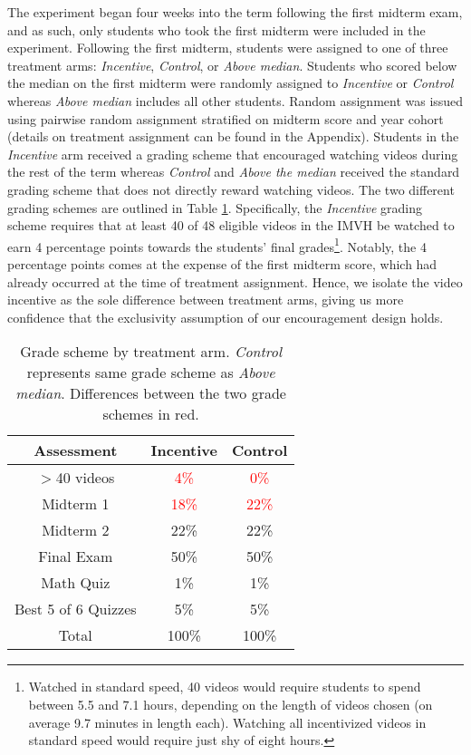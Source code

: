 \documentclass[12pt]{article}
\newcommand{\red}[1]{\textcolor{red}{#1}}
\begin{document}
The experiment began four weeks into the term following the first midterm exam, and as such, only students who took the first midterm were included in the experiment. Following the first midterm, students were assigned to one of three treatment arms: \textit{Incentive}, \textit{Control}, or \textit{Above median}. Students who scored below the median on the first midterm were randomly assigned to \textit{Incentive} or \textit{Control} whereas \textit{Above median} includes all other students. Random assignment was issued using pairwise random assignment stratified on midterm score and year cohort (details on treatment assignment can be found in the Appendix). Students in the \textit{Incentive} arm received a grading scheme that encouraged watching videos during the rest of the term whereas \textit{Control} and \textit{Above the median} received the standard grading scheme that does not directly reward watching videos. The two different grading schemes are outlined in Table \ref{gradescheme}. Specifically, the \textit{Incentive} grading scheme requires that at least 40 of 48 eligible videos in the IMVH be watched to earn 4 percentage points towards the students' final grades\footnote{Watched in standard speed, 40 videos would require students to spend between 5.5 and 7.1 hours, depending on the length of videos chosen (on average 9.7 minutes in length each). Watching all incentivized videos in standard speed would require just shy of eight hours.}.
Notably, the 4 percentage points comes at the expense of the first midterm score, which had already occurred at the time of treatment assignment. Hence, we isolate the video incentive as the sole difference between treatment arms, giving us more confidence that the exclusivity assumption of our encouragement design holds. %

\begin{table}
	\caption{Grade scheme by treatment arm. \textit{Control} represents same grade scheme as \textit{Above median}. Differences between the two grade schemes in red.}
	\centering
	\begin{tabular}{ c|c|c }
		Assessment & Incentive & Control \\
		\hline
		$>$40 videos & \red{4\%} & \red{0\%} \\
		Midterm 1 & \red{18\%} & \red{22\%} \\
		Midterm 2 & 22\% & 22\% \\
		Final Exam & 50\% & 50\% \\
		Math Quiz & 1\% & 1\% \\
		Best 5 of 6 Quizzes & 5\% & 5\% \\
		\hline
		Total & 100\% & 100\% \\
	\end{tabular}
	\label{gradescheme}
\end{table}
\end{document}

